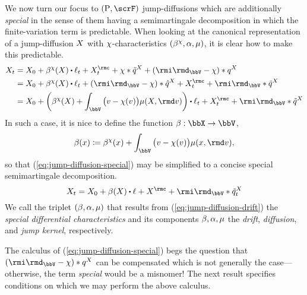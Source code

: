 We now turn our focus to $(\Prb, \scrF)$ jump-diffusions which are additionally \emph{special} in the sense of them having a semimartingale decomposition in which the finite-variation term is predictable.
When looking at the canonical representation of a jump-diffusion $X$ with $\chi$-characteristics $(\beta^\chi, \alpha, \mu)$, it is clear how to make this predictable.
\begin{equation}
  \label{eq:jump-diffusion-special}
  \begin{aligned}
    \X_t 
    &= \X_0 + \affDrift^\trunc(\X) \shortInt \leb_t + \X^\rmc_t + \trunc \ast \compensate{\jumpMeas^\X} + (\id_\vecSpace - \trunc) \ast \jumpMeas^\X \\
    &= \X_0 + \affDrift^\trunc(\X) \shortInt \leb_t + (\id_\vecSpace - \trunc) \ast \predproj{\jumpMeas^\X} + \X^\rmc_t + \id_\vecSpace \ast \compensate{\jumpMeas^\X}  \\
    &= \X_0 + \bigg( \affDrift^\trunc(\X) + \int_\vecSpace \big(\markVar - \trunc(\markVar) \big) \affJump(\X, \rmd\markVar) \bigg) \shortInt \leb_t  + \X^\rmc_t + \id_\vecSpace \ast \compensate{\jumpMeas^\X}  
  \end{aligned}
\end{equation}
In such a case, it is nice to define the function $\affDrift: \stateSpace \rightarrow \vecSpace$,
\begin{equation}
  \label{eq:jump-diffusion-drift}
  \affDrift(\stateVar) \defeq \affDrift^\trunc(\stateVar) + \int_\vecSpace \big(\markVar - \trunc(\markVar)\big) \affJump(\stateVar, \rmd\markVar),
\end{equation}
so that (\ref{eq:jump-diffusion-special}) may be simplified to a concise special semimartingale decomposition.
\[
  \X_t = \X_0 + \affDrift(\X) \shortInt \leb + \X^\rmc + \id_\vecSpace \ast \compensate{\jumpMeas^\X}_t
\]
We call the triplet $(\beta, \alpha, \mu)$ that results from (\ref{eq:jump-diffusion-drift}) the \emph{special differential characteristics} and its components $\beta, \alpha, \mu$ the \emph{drift}, \emph{diffusion}, and \emph{jump kernel}, respectively.

The calculus of (\ref{eq:jump-diffusion-special}) begs the question that $(\id_\vecSpace - \trunc) \ast \jumpMeas^\X$ can be compensated which is not generally the case---otherwise, the term \emph{special} would be a misnomer!
The next result specifies conditions on which we may perform the above calculus.



